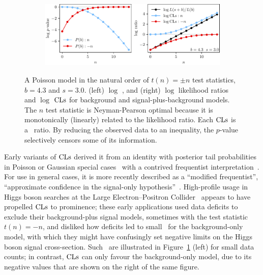 \begin{figure}[tp]
\centering
\begin{subfigure}{\textwidth}
\centering
\includegraphics[width=\textwidth]{figures/searches_cls_plots_with_pvals_n.pdf}
\end{subfigure}
\caption[
A Poisson model in the natural order
]{%
A Poisson model in the natural order of $t(n) = \pm n$
test statistics, $b = 4.3$ and $s = 3.0$.
(left) $\log$ \pvalues,
and (right) $\log$ likelihood ratios and $\log$ $\mathrm{CLs}$ for
background and signal-plus-background models.
The $n$ test statistic is Neyman-Pearson optimal because it is monotonically
(linearly) related to the likelihood ratio.
Each $\mathrm{CLs}$ is a \pvalue\ ratio.
By reducing the observed data to an inequality, the $p$-value selectively
censors some of its information.
}
\label{fig:searches_sb_n}
\end{figure}

Early variants of $\mathrm{CLs}$ derived it from an identity with posterior tail
probabilities in Poisson or Gaussian special cases~\cite{
Helene1983upper,
pdg1988,
read2000modified,
pdg2022ynf
}
with a contrived frequentist interpretation~\cite{zech1988cls}.
For use in general cases, it is more recently described as a
``modified frequentist'',
``approximate confidence in the signal-only hypothesis''~\cite{
read2000modified,
Read2002cls
}.
High-profile usage in Higgs boson searches at the
Large Electron–Positron Collider~\cite{
read1997optimal,
bock1998lower,
etde1998prospects,
junk1999confidence,
lep2000searches,
lep2003search
}
appears to have propelled $\mathrm{CLs}$ to prominence;
these early applications used data deficits to exclude their
background-plus signal models, sometimes with the test statistic $t(n) = -n$,
and disliked how deficits led to small \pvalues\ for the background-only model,
with which they might have confusingly set negative limits on the Higgs boson
signal cross-section.
Such \pvalues\ are illustrated in Figure~\ref{fig:searches_sb_n} (left)
for small data counts;
in contrast, $\mathrm{CLs}$ can only favour the background-only model, due to its
negative values that are shown on the right of the same figure.

